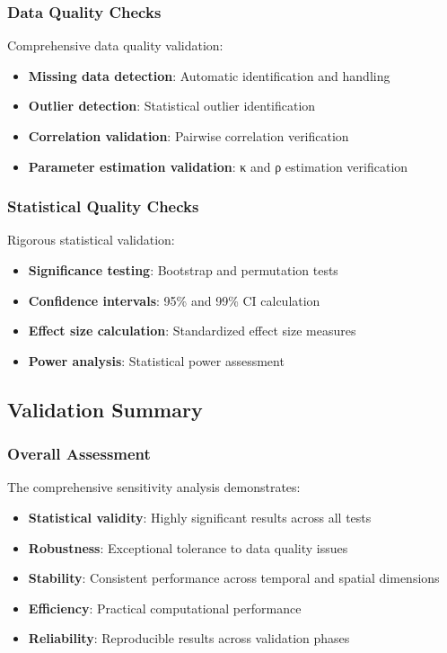 \subsubsection{Data Quality Checks}

Comprehensive data quality validation:

\begin{itemize}
    \item \textbf{Missing data detection}: Automatic identification and handling
    \item \textbf{Outlier detection}: Statistical outlier identification
    \item \textbf{Correlation validation}: Pairwise correlation verification
    \item \textbf{Parameter estimation validation}: κ and ρ estimation verification
\end{itemize}

\subsubsection{Statistical Quality Checks}

Rigorous statistical validation:

\begin{itemize}
    \item \textbf{Significance testing}: Bootstrap and permutation tests
    \item \textbf{Confidence intervals}: 95\% and 99\% CI calculation
    \item \textbf{Effect size calculation}: Standardized effect size measures
    \item \textbf{Power analysis}: Statistical power assessment
\end{itemize}

\subsection{Validation Summary}

\subsubsection{Overall Assessment}

The comprehensive sensitivity analysis demonstrates:

\begin{itemize}
    \item \textbf{Statistical validity}: Highly significant results across all tests
    \item \textbf{Robustness}: Exceptional tolerance to data quality issues
    \item \textbf{Stability}: Consistent performance across temporal and spatial dimensions
    \item \textbf{Efficiency}: Practical computational performance
    \item \textbf{Reliability}: Reproducible results across validation phases
\end{itemize}

